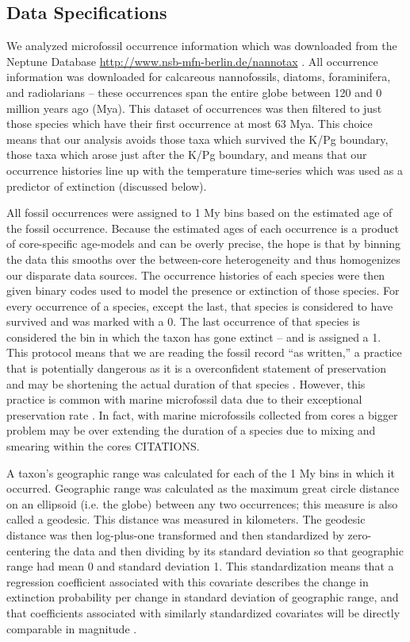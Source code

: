 \documentclass[12pt,letterpaper]{article}
\begin{document}
\subsection{Data Specifications}

We analyzed microfossil occurrence information which was downloaded from the Neptune Database \url{http://www.nsb-mfn-berlin.de/nannotax} \citep{Lazarus1994,SpencerCervato1999}. All occurrence information was downloaded for calcareous nannofossils, diatoms, foraminifera, and radiolarians -- these occurrences span the entire globe between 120 and 0 million years ago (Mya). This dataset of occurrences was then filtered to just those species which have their first occurrence at most 63 Mya. This choice means that our analysis avoids those taxa which survived the K/Pg boundary, those taxa which arose just after the K/Pg boundary, and means that our occurrence histories line up with the temperature time-series which was used as a predictor of extinction (discussed below).

All fossil occurrences were assigned to 1 My bins based on the estimated age of the fossil occurrence. Because the estimated ages of each occurrence is a product of core-specific age-models and can be overly precise, the hope is that by binning the data this smooths over the between-core heterogeneity and thus homogenizes our disparate data sources. The occurrence histories of each species were then given binary codes used to model the presence or extinction of those species. For every occurrence of a species, except the last, that species is considered to have survived and was marked with a 0. The last occurrence of that species is considered the bin in which the taxon has gone extinct -- and is assigned a 1. This protocol means that we are reading the fossil record ``as written,'' a practice that is potentially dangerous as it is a overconfident statement of preservation and may be shortening the actual duration of that species \citep{Alroy2010,Alroy2000b,Alroy2014,Foote1997,Foote1999a,Foote2001,Foote1996e,Lloyd2012b,Marshall1995,Wang2016}. However, this practice is common with marine microfossil data due to their exceptional preservation rate \citep{Ezard2013,Ezard2016,Ezard2011,Liow2010}. In fact, with marine microfossils collected from cores a bigger problem may be over extending the duration of a species due to mixing and smearing within the cores CITATIONS.

A taxon's geographic range was calculated for each of the 1 My bins in which it occurred. Geographic range was calculated as the maximum great circle distance on an ellipsoid (i.e. the globe) between any two occurrences; this measure is also called a geodesic. This distance was measured in kilometers. The geodesic distance was then log-plus-one transformed and then standardized by zero-centering the data and then dividing by its standard deviation so that geographic range had mean 0 and standard deviation 1. This standardization means that a regression coefficient associated with this covariate describes the change in extinction probability per change in standard deviation of geographic range, and that coefficients associated with similarly standardized covariates will be directly comparable in magnitude \citep{ARM}.
\end{document}
